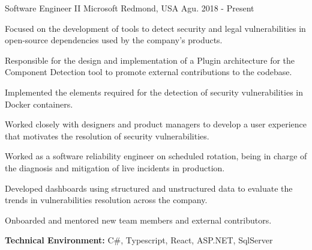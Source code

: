 
\begin{cventries}

\workexperienceentry
{Software Engineer II} %
{Microsoft} %
{Redmond, USA} %
{Agu. 2018 - Present} %
{ %
\begin{cvitems}
    \item {Focused on the development of tools to detect security and legal vulnerabilities in open-source dependencies used by the company's products. }
    \item {Responsible for the design and implementation of a Plugin architecture for the Component Detection tool to promote external contributions to the codebase.}
    \item {Implemented the elements required for the detection of security vulnerabilities in Docker containers.}
    \item {Worked closely with designers and product managers to develop a user experience that motivates the resolution of security vulnerabilities. }
    \item {Worked as a software reliability engineer on scheduled rotation, being in charge of the diagnosis and mitigation of live incidents in production.}
    \item {Developed dashboards using structured and unstructured data to evaluate the trends in vulnerabilities resolution across the company. } 
    \item {Onboarded and mentored new team members and external contributors.} 
\end{cvitems}
}
{\textbf{Technical Environment:} C\#, Typescript, React, ASP.NET, SqlServer}



\end{cventries}
